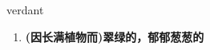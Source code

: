 
\begin{frame}
{\huge verdant}
\begin{center}
\begin{enumerate}\Large
  \item \textbf{(因长满植物而)翠绿的，郁郁葱葱的}
\end{enumerate}
\end{center}
\end{frame}
